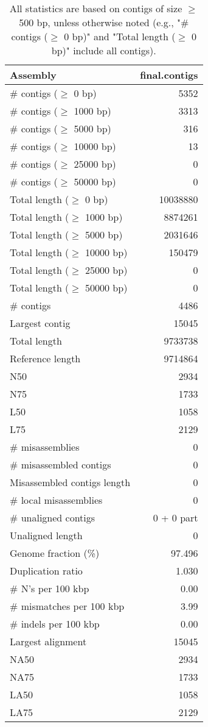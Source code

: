 \documentclass[12pt,a4paper]{article}
\begin{document}
\begin{table}[ht]
\begin{center}
\caption{All statistics are based on contigs of size $\geq$ 500 bp, unless otherwise noted (e.g., "\# contigs ($\geq$ 0 bp)" and "Total length ($\geq$ 0 bp)" include all contigs).}
\begin{tabular}{|l*{1}{|r}|}
\hline
Assembly & final.contigs \\ \hline
\# contigs ($\geq$ 0 bp) & 5352 \\ \hline
\# contigs ($\geq$ 1000 bp) & 3313 \\ \hline
\# contigs ($\geq$ 5000 bp) & 316 \\ \hline
\# contigs ($\geq$ 10000 bp) & 13 \\ \hline
\# contigs ($\geq$ 25000 bp) & 0 \\ \hline
\# contigs ($\geq$ 50000 bp) & 0 \\ \hline
Total length ($\geq$ 0 bp) & 10038880 \\ \hline
Total length ($\geq$ 1000 bp) & 8874261 \\ \hline
Total length ($\geq$ 5000 bp) & 2031646 \\ \hline
Total length ($\geq$ 10000 bp) & 150479 \\ \hline
Total length ($\geq$ 25000 bp) & 0 \\ \hline
Total length ($\geq$ 50000 bp) & 0 \\ \hline
\# contigs & 4486 \\ \hline
Largest contig & 15045 \\ \hline
Total length & 9733738 \\ \hline
Reference length & 9714864 \\ \hline
N50 & 2934 \\ \hline
N75 & 1733 \\ \hline
L50 & 1058 \\ \hline
L75 & 2129 \\ \hline
\# misassemblies & 0 \\ \hline
\# misassembled contigs & 0 \\ \hline
Misassembled contigs length & 0 \\ \hline
\# local misassemblies & 0 \\ \hline
\# unaligned contigs & 0 + 0 part \\ \hline
Unaligned length & 0 \\ \hline
Genome fraction (\%) & 97.496 \\ \hline
Duplication ratio & 1.030 \\ \hline
\# N's per 100 kbp & 0.00 \\ \hline
\# mismatches per 100 kbp & 3.99 \\ \hline
\# indels per 100 kbp & 0.00 \\ \hline
Largest alignment & 15045 \\ \hline
NA50 & 2934 \\ \hline
NA75 & 1733 \\ \hline
LA50 & 1058 \\ \hline
LA75 & 2129 \\ \hline
\end{tabular}
\end{center}
\end{table}
\end{document}
